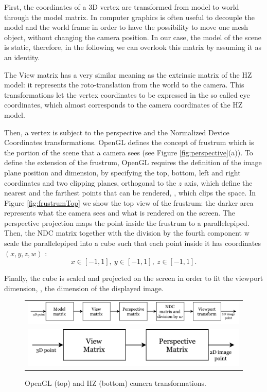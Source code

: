 First, the coordinates of a 3D vertex are transformed from model to world through the model matrix. 
In computer graphics is often useful to decouple the model and the world frame in order to have the possibility to move one mesh object, without changing the camera position. 
In our case, the model of the scene is static, therefore, in the following we can overlook this matrix by assuming it as an identity.

The View matrix has a very similar meaning as the extrinsic matrix of the HZ model: it represents the roto-translation from the world to the camera. This transformations let the vertex coordinates to be expressed in the so called eye coordinates, which almost corresponds to the camera coordinates of the HZ model.

Then, a vertex is subject to the perspective and the Normalized Device Coordinates transformations.
OpenGL defines the concept of frustrum which is the portion of the scene that a camera sees (see Figure \ref{fig:perspective}(a)).
To define the extension of the frustrum, OpenGL requires the definition of the image plane position and dimension, by specifying the top, bottom, left and right coordinates and two clipping planes, orthogonal to the $z$ axis, which define the nearest and the farthest points that can be rendered, \ie, which clips the space. 
In Figure \ref{fig:frustrumTop} we show the top view of the frustrum: the darker area represents what the camera sees and what is rendered on the screen. 
The perspective projection maps the point inside the frustrum to a parallelepiped. 
Then, the NDC matrix together with the division by the fourth component w scale the parallelepiped into a cube such that each point inside it has coordinates $(x,y,z,w)$ :
\begin{equation}
 x \in [-1,1], \:
 y \in [-1,1], \:
 z \in [-1,1] .
\end{equation}

Finally, the cube is scaled and projected on the screen in order to fit the viewport dimension, \ie, the dimension of the displayed image.

\begin{figure}[t]
\centering
 \begin{tabular}{c}
  \includegraphics[height=0.1\columnwidth]{./img/ch-camera/cameraopengl-hz01}\\
  \includegraphics[height=0.1\columnwidth]{./img/ch-camera/cameraopengl-hz02}
 \end{tabular}
 \caption{OpenGL (top) and HZ (bottom) camera transformations.}
 \label{fig:camtrans}
\end{figure}

